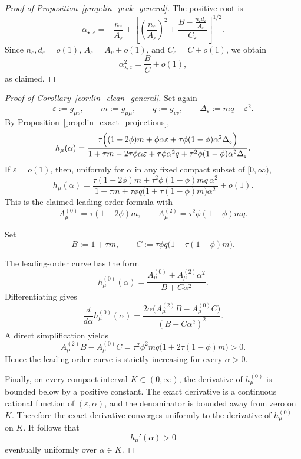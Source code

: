 \documentclass[11pt]{article}
\begin{document}
\begin{proof}[Proof of Proposition~\ref{prop:lin_peak_general}]
The positive root is
\[
\alpha_{\star,\varepsilon}
=
-\frac{n_\varepsilon}{A_\varepsilon}
+
\left[
\left(\frac{n_\varepsilon}{A_\varepsilon}\right)^2
+
\frac{
B-\frac{n_\varepsilon d_\varepsilon}{A_\varepsilon}
}
{C_\varepsilon}
\right]^{1/2}.
\]
Since \(n_\varepsilon,d_\varepsilon=o(1)\),
\(A_\varepsilon=A_v+o(1)\), and \(C_\varepsilon=C+o(1)\), we obtain
\[
\alpha_{\star,\varepsilon}^2
=
\frac{B}{C}+o(1),
\]
as claimed.
\end{proof}

\begin{proof}[Proof of Corollary~\ref{cor:lin_clean_general}]
Set again
\[
\varepsilon:=g_{\mu v},
\qquad
m:=g_{\mu\mu},
\qquad
q:=g_{vv},
\qquad
\Delta_\varepsilon:=mq-\varepsilon^2.
\]
By Proposition~\ref{prop:lin_exact_projections},
\[
h_\mu(\alpha)
=
\frac{
\tau\Bigl((1-2\phi)m
+\phi\alpha\varepsilon
+\tau\phi(1-\phi)\alpha^2\Delta_\varepsilon\Bigr)
}
{
1+\tau m
-2\tau\phi\alpha\varepsilon
+\tau\phi\alpha^2q
+\tau^2\phi(1-\phi)\alpha^2\Delta_\varepsilon
}.
\]
If \(\varepsilon=o(1)\), then, uniformly for \(\alpha\) in any fixed compact
subset of \([0,\infty)\),
\[
h_\mu(\alpha)
=
\frac{
\tau(1-2\phi)m
+
\tau^2\phi(1-\phi)mq\,\alpha^2
}
{
1+\tau m
+
\tau\phi q\bigl(1+\tau(1-\phi)m\bigr)\alpha^2
}
+o(1).
\]
This is the claimed leading-order formula with
\[
A_\mu^{(0)}=\tau(1-2\phi)m,
\qquad
A_\mu^{(2)}=\tau^2\phi(1-\phi)mq.
\]

Set
\[
B:=1+\tau m,
\qquad
C:=\tau\phi q\bigl(1+\tau(1-\phi)m\bigr).
\]


The leading-order curve has the form
\[
h_\mu^{(0)}(\alpha)
=
\frac{A_\mu^{(0)}+A_\mu^{(2)}\alpha^2}{B+C\alpha^2}.
\]
Differentiating gives
\[
\frac{d}{d\alpha}h_\mu^{(0)}(\alpha)
=
\frac{
2\alpha\bigl(A_\mu^{(2)}B-A_\mu^{(0)}C\bigr)
}
{
(B+C\alpha^2)^2
}.
\]
A direct simplification yields
\[
A_\mu^{(2)}B-A_\mu^{(0)}C
=
\tau^2\phi^2mq
\bigl(1+2\tau(1-\phi)m\bigr)
>0.
\]
Hence the leading-order curve is strictly increasing for every
\(\alpha>0\).



Finally, on every compact interval \(K\subset(0,\infty)\), the derivative
of \(h_\mu^{(0)}\) is bounded below by a positive constant. The exact derivative
is a continuous rational function of \((\varepsilon,\alpha)\), and the
denominator is bounded away from zero on \(K\). Therefore the exact derivative
converges uniformly to the derivative of \(h_\mu^{(0)}\) on \(K\). It follows
that
\[
h_\mu'(\alpha)>0
\]
eventually uniformly over \(\alpha\in K\).




\end{proof}
\end{document}
